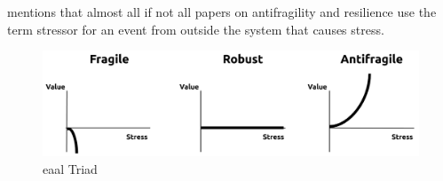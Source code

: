 \textcite[p. 32]{Botjes2020} mentions that almost all if not all papers on antifragility and resilience use the term stressor for an event from outside the system that causes stress. 

\begin{figure}[h!]
	\centering
	\includegraphics[width=0.7\linewidth]{images/eaal-triad}
	\caption[EAAL Triad]{\acrfull{eaal} Triad \parencite{Botjes2020}}
	\label{fig:eaal-triad}
\end{figure}